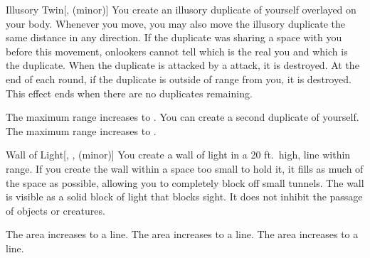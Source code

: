 \lowercase{\hypertarget{spell:Illusory Twin}{}}\label{spell:Illusory Twin}
\begin{freeability}[Rank 2]{\hypertarget{spell:Illusory Twin}{Illusory Twin}}[,  (minor)]
\targetrule
You create an illusory duplicate of yourself overlayed on your body.
Whenever you move, you may also move the illusory duplicate the same distance in any direction.
If the duplicate was sharing a space with you before this movement, onlookers cannot tell which is the real you and which is the duplicate.
When the duplicate is attacked by a  attack, it is destroyed.
At the end of each round, if the duplicate is outside of \rngmed range from you, it is destroyed.
This effect ends when there are no duplicates remaining.

\rankline
{} The maximum range increases to \rnglong.
 You can create a second duplicate of yourself.
 The maximum range increases to \rngext.

\end{freeability}
\vspace{0.25em}



\lowercase{\hypertarget{spell:Wall of Light}{}}\label{spell:Wall of Light}
\begin{freeability}[Rank 2]{\hypertarget{spell:Wall of Light}{Wall of Light}}[, ,  (minor)]
\targetrule
You create a wall of light in a 20 ft.\ high, \areamed line within \rngmed range.
If you create the wall within a space too small to hold it, it fills as much of the space as possible, allowing you to completely block off small tunnels.
The wall is visible as a solid block of light that blocks sight.
It does not inhibit the passage of objects or creatures.

\rankline
{} The area increases to a \arealarge line.
 The area increases to a \areahuge line.
 The area increases to a \areaext line.

\end{freeability}
\vspace{0.25em}



